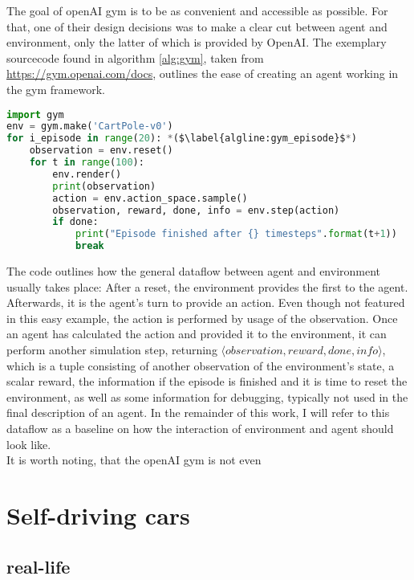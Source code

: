 The goal of openAI gym is to be as convenient and accessible as possible. For that, one of their design decisions was to make a clear cut between agent and environment, only the latter of which is provided by OpenAI. The exemplary sourcecode found in algorithm \ref{alg:gym}, taken from \url{https://gym.openai.com/docs}, outlines the ease of creating an agent working in the gym framework.
\begin{algorithm}[h]
\begin{lstlisting}[language=Python,frame=none]
import gym
env = gym.make('CartPole-v0')
for i_episode in range(20): *($\label{algline:gym_episode}$*)
	observation = env.reset()
	for t in range(100):
		env.render()
		print(observation)
		action = env.action_space.sample()
		observation, reward, done, info = env.step(action)
		if done:
			print("Episode finished after {} timesteps".format(t+1))
			break
\end{lstlisting}%
\caption{Interaction with the openAI gym environment}
\label{alg:gym}
\end{algorithm}
The code outlines how the general dataflow between agent and environment usually takes place: After a reset, the environment provides the first  to the agent. Afterwards, it is the agent's turn to provide an action. Even though not featured in this easy example, the action is performed by usage of the observation. Once an agent has calculated the action and provided it to the environment, it can perform another simulation step, returning $\langle observation, reward, done, info\rangle$, which is a tuple consisting of another observation of the environment's state, a scalar reward, the information if the episode is finished and it is time to reset the environment, as well as some information for debugging, typically not used in the final description of an agent. In the remainder of this work, I will refer to this dataflow as a baseline on how the interaction of environment and agent should look like.\\

It is worth noting, that the openAI gym is not even 


\section{Self-driving cars}

\subsection{real-life}

